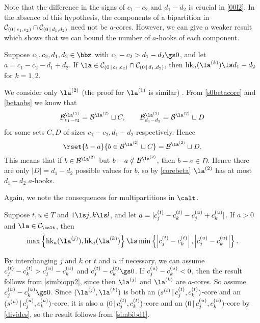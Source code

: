 \documentclass[a4paper, 11pt, twoside]{article}
\begin{document}
Note that the difference in the signs of $c_1-c_2$ and $d_1-d_2$ is crucial in \cref{00l2}. In the absence of this hypothesis, the components of a bipartition in $\mathcal{C}_{(0\,|\,c_1,c_2)}\cap\mathcal{C}_{(0\,|\,d_1,d_2)}$ need not be $a$-cores. However, we can give a weaker result which shows that we can bound the number of $a$-hooks of each component. 

\begin{lemma}\label{simbibd1}
Suppose $c_1,c_2,d_1,d_2\in\bbz$ with $c_1-c_2>d_1-d_2\gs0$, and let $a=c_1-c_2-d_1+d_2$. If $\la\in\mc0{c_1,c_2}\cap\mc0{d_1,d_2}$, then $\hk a{\cpt\la k}\ls d_1-d_2$ for $k=1,2$.
\end{lemma}

\begin{pf}
We consider only $\cpt\la2$ (the proof for $\cpt\la1$ is similar)%
. From \ref{s0betacore} and \cref{betaobs} we know that
\[
\ber{\cpt\la1}{c_1-c_2}=\be{\cpt\la2}\sqcup C,\qquad\ber{\cpt\la1}{d_1-d_2}=\be{\cpt\la2}\sqcup D
\]
for some sets $C,D$ of sizes $c_1-c_2,d_1-d_2$ respectively. Hence
\[
\rset{b-a}{b\in\be{\cpt\la2}\sqcup C}=\be{\cpt\la2}\sqcup D.
\]
This means that if $b\in\be{\cpt\la2}$ but $b-a\notin\be{\cpt\la2}$, then $b-a\in D$. Hence there are only $|D|=d_1-d_2$ possible values for $b$, so by \cref{corebeta} $\cpt\la2$ has at most $d_1-d_2$ $a$-hooks.
\end{pf}

Again, we note the consequences for multipartitions in $\calt$.

\begin{cory}\label{simbibd2}
Suppose $t,u\in T$ and $1\ls j,k\ls l$, and let $a=|c^{(t)}_j-c^{(t)}_k-c^{(u)}_j+c^{(u)}_k|$. If $a>0$ and $\la\in\smc\calt$, then
\[
\max\left\{\hk a{\cpt\la j},\hk a{\cpt\la k}\right\}\ls\min\left\{\left|\sof ct_j-\sof ct_k\right|,\left|\sof cu_j-\sof cu_k\right|\right\}.
\]
\end{cory}

\begin{pf}
By interchanging $j$ and $k$ or $t$ and $u$ if necessary, we can assume $c^{(t)}_j-c^{(t)}_k>c^{(u)}_j-c^{(u)}_k$ and $\sof ct_j-\sof ct_k\gs0$. If $c^{(u)}_j-c^{(u)}_k<0$, then the result follows from \cref{simbiopp2}, since then $\cpt\la j$ and $\cpt\la k$ are $a$-cores. So assume $\sof cu_j-\sof cu_k\gs0$. Since $(\cpt\la j,\cpt\la k)$ is both an $(s^{(t)}\,|\,c^{(t)}_j,c^{(t)}_k)$-core and an $(s^{(u)}\,|\,c^{(u)}_j,c^{(u)}_k)$-core, it is also a $(0\,|\,c^{(t)}_j,c^{(t)}_k)$-core and an $(0\,|\,c^{(u)}_j,c^{(u)}_k)$-core by \cref{divides}, so the result follows from \cref{simbibd1}.
\end{pf}
\end{document}
